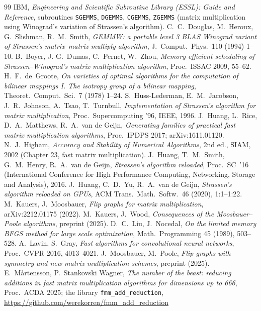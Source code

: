 \documentclass[11pt]{article}
\begin{document}
{\begin{thebibliography}{99}
 IBM, \emph{Engineering and Scientific Subroutine Library
(ESSL): Guide and Reference}, subroutines \texttt{SGEMMS}, \texttt{DGEMMS},
\texttt{CGEMMS}, \texttt{ZGEMMS} (matrix multiplication using Winograd's
variation of Strassen's algorithm).
 C.~C.~Douglas, M.~Heroux, G.~Slishman, R.~M.~Smith,
\emph{GEMMW: a portable level 3 BLAS Winograd variant of Strassen's
matrix--matrix multiply algorithm}, J.\ Comput.\ Phys.\ 110 (1994) 1--10.
 B.~Boyer, J.-G.~Dumas, C.~Pernet, W.~Zhou, \emph{Memory
efficient scheduling of Strassen--Winograd's matrix multiplication
algorithm}, Proc.\ ISSAC 2009, 55--62.
 H.~F.~de~Groote, \emph{On varieties of optimal algorithms
for the computation of bilinear mappings I.  The isotropy group of a bilinear
mapping}, Theoret.\ Comput.\ Sci.\ 7 (1978) 1--24.
 S.~Huss-Lederman, E.~M.~Jacobson, J.~R.~Johnson,
A.~Tsao, T.~Turnbull, \emph{Implementation of Strassen's algorithm for
matrix multiplication}, Proc.\ Supercomputing '96, IEEE, 1996.
 J.~Huang, L.~Rice, D.~A.~Matthews, R.~A.~van de Geijn,
\emph{Generating families of practical fast matrix multiplication
algorithms}, Proc.\ IPDPS 2017; arXiv:1611.01120.
 N.~J.~Higham, \emph{Accuracy and Stability of Numerical
Algorithms}, 2nd ed., SIAM, 2002 (Chapter 23, fast matrix multiplication).
 J.~Huang, T.~M.~Smith, G.~M.~Henry, R.~A.~van de Geijn,
\emph{Strassen's algorithm reloaded}, Proc.\ SC~'16 (International
Conference for High Performance Computing, Networking, Storage and
Analysis), 2016.
 J.~Huang, C.~D.~Yu, R.~A.~van de Geijn, \emph{Strassen's
algorithm reloaded on GPUs}, ACM Trans.\ Math.\ Softw.\ 46 (2020), 1:1--1:22.
 M.~Kauers, J.~Moosbauer, \emph{Flip graphs for matrix
multiplication}, arXiv:2212.01175 (2022).
 M.~Kauers, J.~Wood, \emph{Consequences of the Moosbauer--Poole
algorithms}, preprint (2025).
 D.~C.~Liu, J.~Nocedal, \emph{On the limited memory BFGS method
for large scale optimization}, Math.\ Programming 45 (1989), 503--528.
 A.~Lavin, S.~Gray, \emph{Fast algorithms for convolutional
neural networks}, Proc.\ CVPR 2016, 4013--4021.
 J.~Moosbauer, M.~Poole, \emph{Flip graphs with symmetry and
new matrix multiplication schemes}, preprint (2025).
 E.~M\r{a}rtensson, P.~Stankovski Wagner, \emph{The number of
the beast: reducing additions in fast matrix multiplication algorithms
for dimensions up to 666}, Proc.\ ACDA 2025; the library
\texttt{fmm\_add\_reduction}, \url{https://github.com/werekorren/fmm_add_reduction}

\end{thebibliography}}
\end{document}
